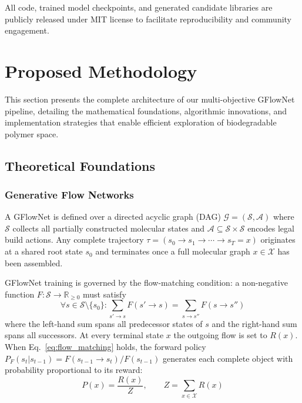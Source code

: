 \documentclass[twocolumn,10pt]{article}
\begin{document}
All code, trained model checkpoints, and generated candidate libraries are publicly released under MIT license to facilitate reproducibility and community engagement.


\section{Proposed Methodology}

This section presents the complete architecture of our multi-objective GFlowNet pipeline, detailing the mathematical foundations, algorithmic innovations, and implementation strategies that enable efficient exploration of biodegradable polymer space.

\subsection{Theoretical Foundations}

\subsubsection{Generative Flow Networks}

A GFlowNet is defined over a directed acyclic graph (DAG) $\mathcal{G} = (\mathcal{S}, \mathcal{A})$ where $\mathcal{S}$ collects all partially constructed molecular states and $\mathcal{A} \subseteq \mathcal{S} \times \mathcal{S}$ encodes legal build actions. Any complete trajectory $\tau = (s_0 \to s_1 \to \cdots \to s_T = x)$ originates at a shared root state $s_0$ and terminates once a full molecular graph $x \in \mathcal{X}$ has been assembled.

GFlowNet training is governed by the flow-matching condition: a non-negative function $F: \mathcal{S} \to \mathbb{R}_{\geq 0}$ must satisfy
\begin{equation}
\forall s \in \mathcal{S} \setminus \{s_0\}: \sum_{s' \to s} F(s' \to s) = \sum_{s \to s''} F(s \to s'')
\label{eq:flow_matching}
\end{equation}
where the left-hand sum spans all predecessor states of $s$ and the right-hand sum spans all successors. At every terminal state $x$ the outgoing flow is set to $R(x)$. When Eq.~\ref{eq:flow_matching} holds, the forward policy $P_F(s_t | s_{t-1}) = F(s_{t-1} \to s_t) / F(s_{t-1})$ generates each complete object with probability proportional to its reward:
\begin{equation}
P(x) = \frac{R(x)}{Z}, \qquad Z = \sum_{x \in \mathcal{X}} R(x)
\label{eq:gfn_sampling}
\end{equation}
\end{document}
